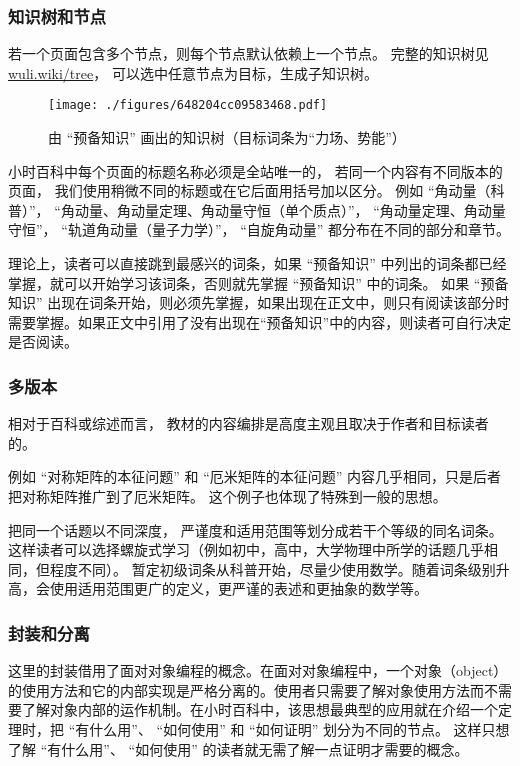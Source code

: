 
\subsubsection{知识树和节点}
若一个页面包含多个节点，则每个节点默认依赖上一个节点。 完整的知识树见 \href{https://wuli.wiki/tree}{wuli.wiki/tree}， 可以选中任意节点为目标，生成子知识树。

\begin{figure}[ht]
\centering
\texttt{[image: ./figures/648204cc09583468.pdf]}
\caption{由 “预备知识” 画出的知识树（目标词条为“力场、势能”）}\label{fig_about_1}
\end{figure}

小时百科中每个页面的标题名称必须是全站唯一的， 若同一个内容有不同版本的页面， 我们使用稍微不同的标题或在它后面用括号加以区分。 例如 “角动量（科普）”， “角动量、角动量定理、角动量守恒（单个质点）”， “角动量定理、角动量守恒”， “轨道角动量（量子力学）”， “自旋角动量” 都分布在不同的部分和章节。

理论上，读者可以直接跳到最感兴的词条，如果 “预备知识” 中列出的词条都已经掌握，就可以开始学习该词条，否则就先掌握 “预备知识” 中的词条。 如果 “预备知识” 出现在词条开始，则必须先掌握，如果出现在正文中，则只有阅读该部分时需要掌握。如果正文中引用了没有出现在“预备知识”中的内容，则读者可自行决定是否阅读。

\subsubsection{多版本}
相对于百科或综述而言， 教材的内容编排是高度主观且取决于作者和目标读者的。

例如 “对称矩阵的本征问题” 和 “厄米矩阵的本征问题” 内容几乎相同，只是后者把对称矩阵推广到了厄米矩阵。 这个例子也体现了特殊到一般的思想。

把同一个话题以不同深度， 严谨度和适用范围等划分成若干个等级的同名词条。 这样读者可以选择螺旋式学习（例如初中，高中，大学物理中所学的话题几乎相同，但程度不同）。 暂定初级词条从科普开始，尽量少使用数学。随着词条级别升高，会使用适用范围更广的定义，更严谨的表述和更抽象的数学等。

\subsubsection{封装和分离}
这里的封装借用了面对对象编程的概念。在面对对象编程中，一个对象（object）的使用方法和它的内部实现是严格分离的。使用者只需要了解对象使用方法而不需要了解对象内部的运作机制。在小时百科中，该思想最典型的应用就在介绍一个定理时，把 “有什么用”、 “如何使用” 和 “如何证明” 划分为不同的节点。 这样只想了解 “有什么用”、 “如何使用” 的读者就无需了解一点证明才需要的概念。

